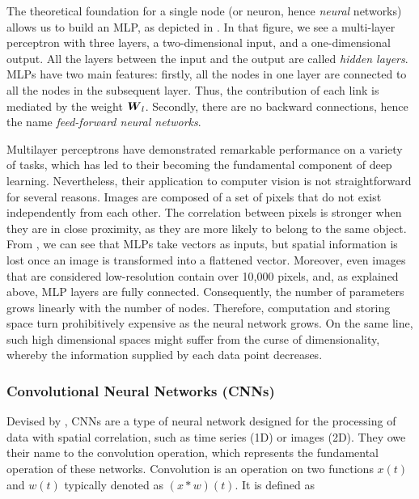 The theoretical foundation for a single node (or neuron, hence \textit{neural} networks) allows us to build an MLP, as depicted in . In that figure, we see a multi-layer perceptron with three layers, a two-dimensional input, and a one-dimensional output. All the layers between the input and the output are called \textit{hidden layers}. MLPs have two main features: firstly, all the nodes in one layer are connected to all the nodes in the subsequent layer. Thus, the contribution of each link is mediated by the weight $\boldsymbol{W}_l$. Secondly, there are no backward connections, hence the name \textit{feed-forward neural networks}.

Multilayer perceptrons have demonstrated remarkable performance on a variety of tasks, which has led to their becoming the fundamental component of deep learning. Nevertheless, their application to computer vision is not straightforward for several reasons. Images are composed of a set of pixels that do not exist independently from each other. The correlation between pixels is stronger when they are in close proximity, as they are more likely to belong to the same object. From , we can see that MLPs take vectors as inputs, but spatial information is lost once an image is transformed into a flattened vector. Moreover, even images that are considered low-resolution contain over 10,000 pixels, and, as explained above, MLP layers are fully connected. Consequently, the number of parameters grows linearly with the number of nodes. Therefore, computation and storing space turn prohibitively expensive as the neural network grows. On the same line, such high dimensional spaces might suffer from the curse of dimensionality, whereby the information supplied by each data point decreases.

\subsubsection{Convolutional Neural Networks (CNNs)} Devised by , CNNs are a type of neural network designed for the processing of data with spatial correlation, such as time series (1D) or images (2D). They owe their name to the convolution operation, which represents the fundamental operation of these networks. Convolution is an operation on two functions $x(t)$ and $w(t)$ typically denoted as $(x\ast w)(t)$. It is defined as

